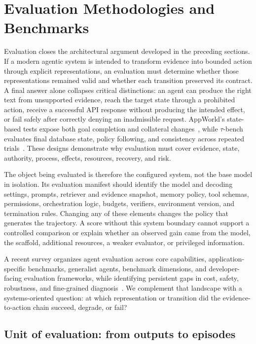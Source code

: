 \section{Evaluation Methodologies and Benchmarks}
\label{sec:evaluation}

Evaluation closes the architectural argument developed in the preceding sections. If a modern agentic system is intended to transform evidence into bounded action through explicit representations, an evaluation must determine whether those representations remained valid and whether each transition preserved its contract. A final answer alone collapses critical distinctions: an agent can produce the right text from unsupported evidence, reach the target state through a prohibited action, receive a successful API response without producing the intended effect, or fail safely after correctly denying an inadmissible request. AppWorld's state-based tests expose both goal completion and collateral changes~\cite{trivedi2024appworld}, while $\tau$-bench evaluates final database state, policy following, and consistency across repeated trials~\cite{yao2024taubench}. These designs demonstrate why evaluation must cover evidence, state, authority, process, effects, resources, recovery, and risk.

The object being evaluated is therefore the configured system, not the base model in isolation. Its evaluation manifest should identify the model and decoding settings, prompts, retriever and evidence snapshot, memory policy, tool schemas, permissions, orchestration logic, budgets, verifiers, environment version, and termination rules. Changing any of these elements changes the policy that generates the trajectory. A score without this system boundary cannot support a controlled comparison or explain whether an observed gain came from the model, the scaffold, additional resources, a weaker evaluator, or privileged information.

A recent survey organizes agent evaluation across core capabilities, application-specific benchmarks, generalist agents, benchmark dimensions, and developer-facing evaluation frameworks, while identifying persistent gaps in cost, safety, robustness, and fine-grained diagnosis~\cite{yehudai2026agentsurveyeval}. We complement that landscape with a systems-oriented question: at which representation or transition did the evidence-to-action chain succeed, degrade, or fail?

\subsection{Unit of evaluation: from outputs to episodes}

